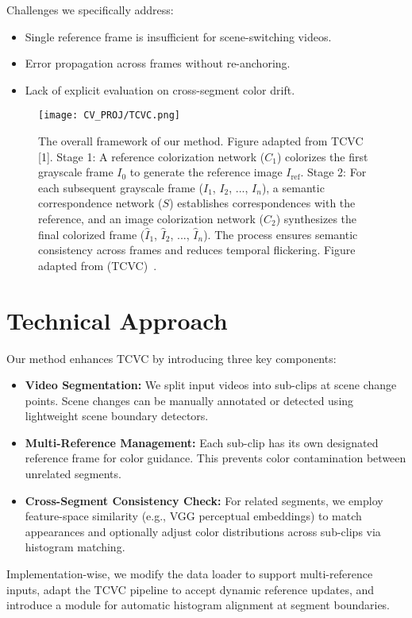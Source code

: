 \documentclass[10pt,twocolumn,letterpaper]{article}
\begin{document}
Challenges we specifically address:
\begin{itemize}
    \item Single reference frame is insufficient for scene-switching videos.
    \item Error propagation across frames without re-anchoring.
    \item Lack of explicit evaluation on cross-segment color drift.
\end{itemize}

\begin{figure*}[ht]
    \centering
    \texttt{[image: CV\_PROJ/TCVC.png]}
    \caption{The overall framework of our method. Figure adapted from TCVC [1].  Stage 1: A reference colorization network ($C_1$) colorizes the first grayscale frame $I_0$ to generate the reference image $I_{\text{ref}}$. Stage 2: For each subsequent grayscale frame ($I_1$, $I_2$, ..., $I_n$), a semantic correspondence network ($S$) establishes correspondences with the reference, and an image colorization network ($C_2$) synthesizes the final colorized frame ($\hat{I}_1$, $\hat{I}_2$, ..., $\hat{I}_n$). The process ensures semantic consistency across frames and reduces temporal flickering. Figure adapted from{ (TCVC)}~\cite{tcvc}.}
    \label{fig:tcvc_overall}
\end{figure*}

\section{Technical Approach}
Our method enhances TCVC by introducing three key components:
\begin{itemize}
    \item \textbf{Video Segmentation:} We split input videos into sub-clips at scene change points. Scene changes can be manually annotated or detected using lightweight scene boundary detectors.
    \item \textbf{Multi-Reference Management:} Each sub-clip has its own designated reference frame for color guidance. This prevents color contamination between unrelated segments.
    \item \textbf{Cross-Segment Consistency Check:} For related segments, we employ feature-space similarity (e.g., VGG perceptual embeddings) to match appearances and optionally adjust color distributions across sub-clips via histogram matching.
\end{itemize}

Implementation-wise, we modify the data loader to support multi-reference inputs, adapt the TCVC pipeline to accept dynamic reference updates, and introduce a module for automatic histogram alignment at segment boundaries.
\end{document}
